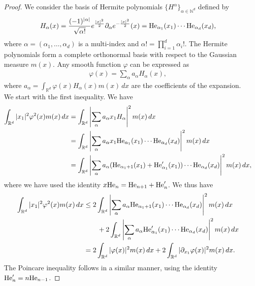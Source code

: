 \documentclass[11pt]{amsart}
\numberwithin{equation}{section}
\def\R{\mathbb{R}}
\def\N{\mathbb{N}}
\begin{document}
% 
\begin{proof}
  We consider the basis of Hermite polynomials $\{H^\alpha\}_{\alpha\in \N^d}$ defined by
  \begin{align*}
    H_\alpha(x) = \frac{(-1)^{|\alpha|}}{\sqrt{\alpha!}} e^{\frac{|x|^2}{2}} \partial_\alpha e^{-\frac{|x|^2}{2}}(x)
    = \textnormal{He}_{\alpha_1}(x_1) \cdots \textnormal{He}_{\alpha_d}(x_d),
  \end{align*}
  where $\alpha = (\alpha_1, \ldots, \alpha_d)$ is a multi-index and $\alpha! = \prod_{i=1}^d \alpha_i!$.
  The Hermite polynomials form a complete orthonormal basis with respect to the Gaussian measure $m(x)$. Any smooth function $\varphi$ can be expressed as
  \begin{align*}
    \varphi(x) = \sum_{\alpha} a_\alpha H_\alpha(x),
  \end{align*}
  where $a_\alpha = \int_{\R^d} \varphi(x) H_\alpha(x) m(x) \, dx$ are the coefficients of the expansion. We start with the first inequality. We have
  \begin{align*}
    \int_{\R^d} \vert x_1 \vert^2\varphi^2(x) m(x)\,dx &= \int_{\R^d}\left|\sum_{\alpha} a_\alpha x_1 H_\alpha \right|^2m(x)\,dx\\
    &=\int_{\R^d}\left|\sum_{\alpha} a_\alpha x_1\textnormal{He}_{\alpha_1}(x_1)\cdots \textnormal{He}_{\alpha_d}(x_d)\right|^2m(x)\,dx\\
    &=\int_{\R^d}\left|\sum_{\alpha} a_\alpha (\textnormal{He}_{\alpha_1+1}(x_1)+\textnormal{He}_{\alpha_1}'(x_1) )\cdots \textnormal{He}_{\alpha_d}(x_d)\right|^2m(x)\,dx,\\
  \end{align*}
  where we have used the identity $x\textnormal{He}_n=\textnormal{He}_{n+1}+\textnormal{He}_n'$. We thus have
  \begin{align*}
    \int_{\R^d} \vert x_1 \vert^2\varphi^2(x) m(x)\,dx&\le 2\int_{\R^d}\left|\sum_{\alpha} a_\alpha \textnormal{He}_{\alpha_1+1}(x_1)\cdots \textnormal{He}_{\alpha_d}(x_d)\right|^2m(x)\,dx\\
    &\qquad + 2\int_{\R^d}\left|\sum_{\alpha} a_\alpha \textnormal{He}_{\alpha_1}'(x_1)\cdots \textnormal{He}_{\alpha_d}(x_d)\right|^2m(x)\,dx\\
    &= 2\int_{\R^d} |\varphi(x)|^2 m(x)\,dx + 2\int_{\R^d} |\partial_{x_1}\varphi(x)|^2 m(x)\,dx.
  \end{align*}
  The Poincare inequality follows in a similar manner, using the identity $\textnormal{He}_n'=n\textnormal{He}_{n-1}$.
\end{proof}
\end{document}
